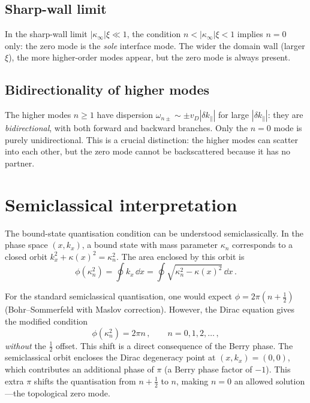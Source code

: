 \subsection{Sharp-wall limit}
\label{sec:ch8-sharp-wall}

In the sharp-wall limit $|\kappa_\infty|\xi\ll 1$, the condition
$n<|\kappa_\infty|\xi<1$ implies $n=0$ only: the zero mode is the
\emph{sole} interface mode.  The wider the domain wall (larger $\xi$),
the more higher-order modes appear, but the zero mode is always present.

\subsection{Bidirectionality of higher modes}
\label{sec:ch8-bidirectional}

The higher modes $n\geq 1$ have dispersion
$\omega_{n\pm}\sim\pm v_D|\delta k_\parallel|$ for large
$|\delta k_\parallel|$: they are \emph{bidirectional}, with both
forward and backward branches.  Only the $n=0$ mode is purely
unidirectional.  This is a crucial distinction: the higher modes can
scatter into each other, but the zero mode cannot be backscattered
because it has no partner.

\section{Semiclassical interpretation}
\label{sec:ch8-semiclassical}

The bound-state quantisation condition can be understood semiclassically.
In the phase space $(x,k_x)$, a bound state with mass parameter
$\kappa_n$ corresponds to a closed orbit
$k_x^2+\kappa(x)^2=\kappa_n^2$.  The area enclosed by this orbit is
\begin{equation}\label{eq:ch8-phase-area}
  \phi(\kappa_n^2) = \oint k_x\,\dd x
  = \oint\sqrt{\kappa_n^2-\kappa(x)^2}\,\dd x\,.
\end{equation}

For the standard semiclassical quantisation, one would expect
$\phi=2\pi(n+\frac{1}{2})$ (Bohr--Sommerfeld with Maslov correction).
However, the Dirac equation gives the modified condition
\begin{equation}\label{eq:ch8-modified-bs}
  \phi(\kappa_n^2) = 2\pi n\,,
  \qquad n=0,1,2,\ldots\,,
\end{equation}
\emph{without} the $\frac{1}{2}$ offset.  This shift is a direct
consequence of the Berry phase.  The semiclassical orbit encloses the
Dirac degeneracy point at $(x,k_x)=(0,0)$, which contributes an
additional phase of $\pi$ (a Berry phase factor of $-1$).  This extra
$\pi$ shifts the quantisation from $n+\frac{1}{2}$ to $n$, making
$n=0$ an allowed solution---the topological zero mode.

